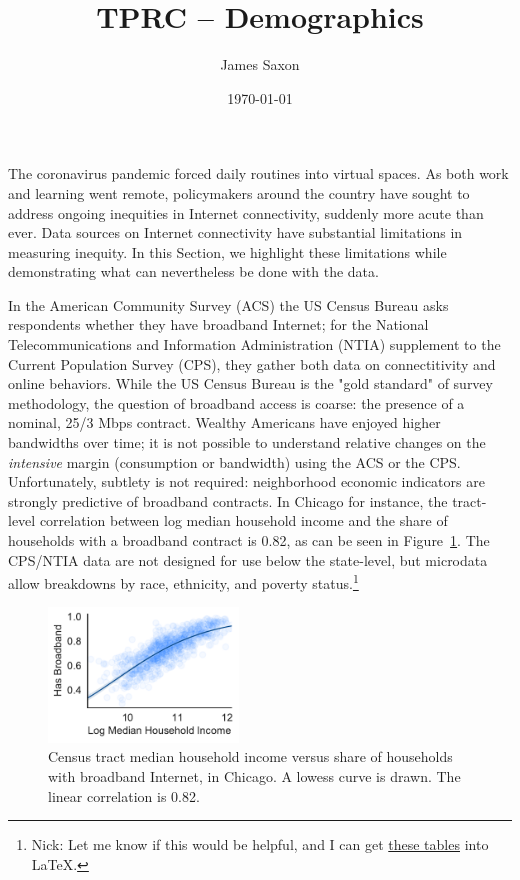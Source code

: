 \documentclass[11 pt]{amsart}
\title[TPRC -- Demographics]{TPRC -- Demographics}
\date{\today}
\author[Saxon]{\vspace{-1.7em} James Saxon}
\begin{document}
The coronavirus pandemic forced daily routines into virtual spaces.
As both work and learning went remote, policymakers around the country
have sought to address ongoing inequities in Internet connectivity,
suddenly more acute than ever.
Data sources on Internet connectivity have substantial limitations
in measuring inequity.
In this Section, we highlight these limitations
while demonstrating what can nevertheless be done with the data.

In the American Community Survey (ACS)
the US Census Bureau asks respondents whether they have broadband Internet;
for the National Telecommunications and Information Administration (NTIA) supplement to the Current Population Survey (CPS),
they gather both data on connectitivity and online behaviors.
While the US Census Bureau is the "gold standard" of survey methodology,
the question of broadband access is coarse: the presence of a nominal, 25/3 Mbps contract.
Wealthy Americans have enjoyed higher bandwidths over time;
it is not possible to understand relative changes on the
\emph{intensive} margin (consumption or bandwidth) using the ACS or the CPS.
Unfortunately, subtlety is not required:
neighborhood economic indicators are strongly predictive of broadband contracts.
In Chicago for instance, the tract-level correlation between
log median household income and
the share of households with a broadband contract is 0.82,
as can be seen in Figure~\ref{fig:chicago_broadband_income}.
The CPS/NTIA data are not designed for use below the state-level,
but microdata allow breakdowns by race, ethnicity, and poverty status.\footnote{Nick: Let me know if this would be helpful, and I can get \href{https://github.com/JamesSaxon/neighborhood\_broadband/blob/master/census/ipums.ipynb}{these tables} into \LaTeX.}

\begin{figure}[]
\centering
\includegraphics[width=0.45\textwidth]{broadband_income.pdf}
\caption{Census tract median household income versus share of households with broadband Internet, in Chicago.  A lowess curve is drawn. The linear correlation is 0.82. \label{fig:chicago_broadband_income}}
\end{figure}
\end{document}
